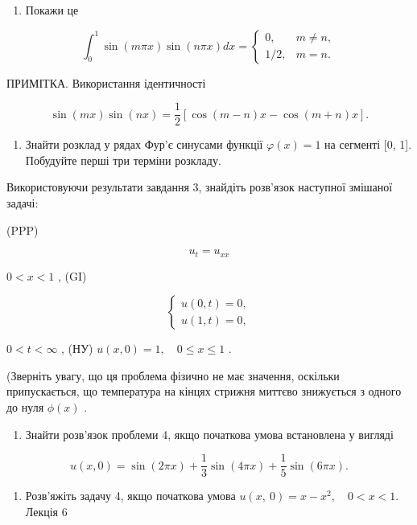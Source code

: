 \documentclass[
  ukrainian,
]{article}
\providecommand{\tightlist}{%
  \setlength{\itemsep}{0pt}\setlength{\parskip}{0pt}}
\begin{document}
\begin{enumerate}
\def\labelenumi{\arabic{enumi}.}
\setcounter{enumi}{1}
\tightlist
\item
  Покажи це
\end{enumerate}

\[
\int_0^1 \sin(m\pi x) \sin(n\pi x) dx = \begin{cases} 0, & m \neq n, \\ 1/2, & m = n. \end{cases}
\]

ПРИМІТКА. Використання ідентичності

\[
\sin(mx)\sin(nx) = \frac{1}{2}[\cos(m-n)x - \cos(m+n)x].
\]

\begin{enumerate}
\def\labelenumi{\arabic{enumi}.}
\setcounter{enumi}{2}
\tightlist
\item
  Знайти розклад у рядах Фур'є синусами функції \(\varphi(x) = 1\) на
  сегменті {[}0, 1{]}. Побудуйте перші три терміни розкладу.
\end{enumerate}

Використовуючи результати завдання 3, знайдіть розв'язок наступної
змішаної задачі:

(PPP)

\[
u_t = u_{xx}
\]

\(0 < x < 1\) , (GI)

\[
\begin{cases} u(0, t) = 0, \\ u(1, t) = 0, \end{cases}
\]

\(0 < t < \infty\) , (НУ) \(u(x, 0) = 1, \quad 0 \le x \le 1\) .

(Зверніть увагу, що ця проблема фізично не має значення, оскільки
припускається, що температура на кінцях стрижня миттєво знижується з
одного до нуля \(\phi(x)\) .

\begin{enumerate}
\def\labelenumi{\arabic{enumi}.}
\setcounter{enumi}{4}
\tightlist
\item
  Знайти розв'язок проблеми 4, якщо початкова умова встановлена у
  вигляді
\end{enumerate}

\[
u(x, 0) = \sin(2\pi x) + \frac{1}{3}\sin(4\pi x) + \frac{1}{5}\sin(6\pi x).
\]

\begin{enumerate}
\def\labelenumi{\arabic{enumi}.}
\setcounter{enumi}{5}
\tightlist
\item
  Розв'яжіть задачу 4, якщо початкова умова
  \(u\left( x,\ 0\right) =x-x^{2},\quad 0< x<1.\) Лекція 6
\end{enumerate}
\end{document}
